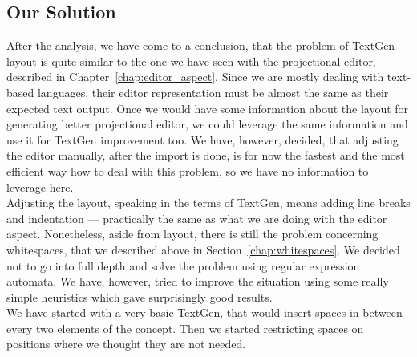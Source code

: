\subsection{Our Solution}
\label{chap:textgen_solution}

After the analysis, we have come to a conclusion, that the problem of TextGen layout is quite similar to the one we have seen with the projectional editor, described in Chapter~\ref{chap:editor_aspect}.
Since we are mostly dealing with text-based languages, their editor representation must be almost the same as their expected text output.
Once we would have some information about the layout for generating better projectional editor, we could leverage the same information and use it for TextGen improvement too.
We have, however, decided, that adjusting the editor manually, after the import is done, is for now the fastest and the most efficient way how to deal with this problem, so we have no information to leverage here.
\\

Adjusting the layout, speaking in the terms of TextGen, means adding line breaks and indentation --- practically the same as what we are doing with the editor aspect.
Nonetheless, aside from layout, there is still the problem concerning whitespaces, that we described above in Section~\ref{chap:whitespaces}.
We decided not to go into full depth and solve the problem using regular expression automata.
We have, however, tried to improve the situation using some really simple heuristics which gave surprisingly good results.
\\

We have started with a very basic TextGen, that would insert spaces in between every two elements of the concept.
Then we started restricting spaces on positions where we thought they are not needed.

